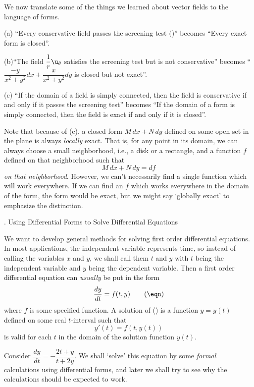 We now translate some of the things we learned about vector
fields to the language of forms.

(a) ``Every conservative field passes the screening test (\eqn)''
becomes ``Every exact form is closed''.

(b)``The field $\dfrac 1r\u_\theta$ satisfies the screening test
but is not conservative'' becomes
``$\dfrac{-y}{x^2 + y^2}dx + \dfrac x{x^2 + y^2} dy$ is closed
but not exact''.

(c) ``If the domain of a field is simply connected, then the field is
conservative if and only if it passes the screening test''
becomes ``If the domain of a form is simply connected, then the field
is exact if and only if it is closed''.

Note that because of (c), a closed form
$M\,dx + N\,dy$ defined on some open set in the plane
 is always {\it
locally\/} exact.  That is, for any point in its domain, we can
always choose a small neighborhood, i.e., a disk or a rectangle,
and a function $f$ defined on that neighborhood such that
$$
  M\,dx + N\,dy = df
$$
{\it on that neighborhood}.   However, we can't necessarily
find a single function which will work everywhere.  If we
can find an $f$ which works everywhere in the domain of the
form,
 the form would be exact, but we might say
`globally exact' to emphasize the distinction. 

\bigskip

\bigskip

\head \sn. Using Differential Forms to Solve Differential Equations \endhead

We want to develop general methods for solving first order
differential equations.   In most applications, the independent
variable represents time, so instead of calling the variables
$x$ and $y$, we shall call them $t$ and $y$ with $t$ being the
independent variable and $y$ being the dependent variable.  
Then a first order differential equation can {\it usually\/} be put
in the form
\nexteqn
$$
  \frac{dy}{dt} = f(t,y)\tag\eqn
$$
where $f$ is some specified function.  A solution  of (\eqn)
is a function  $y = y(t)$ defined on some  real $t$-interval
 such that
$$
y'(t) = f(t,y(t))
$$
is valid for each $t$ in the domain of the solution function $y(t)$.

\nextex
{}   Consider $\dfrac{dy}{dt} = -\dfrac{2t+y}{t +2y}$.
We shall 
`solve' this equation by some {\it formal\/} calculations using differential
forms, and later we shall try to see why the calculations should be
expected to work.


